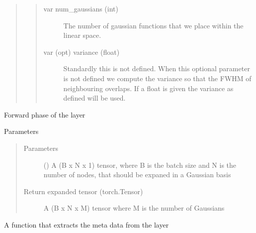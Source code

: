 \documentclass[letterpaper,10pt,english]{sphinxmanual}
\begin{document}
\begin{fulllineitems}
\begin{quote}
\begin{quote}
\begin{description}
\item[{var num\_gaussians (int)}] \leavevmode
The number of gaussian functions that we place within the linear space.

\item[{var (opt) variance (float)}] \leavevmode
Standardly this is not defined. When this optional parameter is not
defined we compute the variance so that the FWHM of neighbouring
overlaps. If a float is given the variance as defined will be used.

\end{description}\end{quote}
\end{quote}

\begin{fulllineitems}
\label{\detokenize{modules/gqcml.nn:gqcml.nn.layers.GaussianExpansion.forward}}
Forward phase of the layer

Parameters
\begin{quote}\begin{description}
\item[{Parameters}] \leavevmode
\sphinxstyleliteralstrong{\sphinxupquote{(}} () \textendash{} A (B x N x 1) tensor, where B is the batch size and N is the number of nodes,
that should be expaned in a Gaussian basis

\item[{Return expanded tensor (torch.Tensor)}] \leavevmode
A (B x N x M) tensor where M is the number of Gaussians

\end{description}\end{quote}

\end{fulllineitems}


\begin{fulllineitems}
\label{\detokenize{modules/gqcml.nn:gqcml.nn.layers.GaussianExpansion.meta}}
A function that extracts the meta data from the layer

\end{fulllineitems}


\end{fulllineitems}
\end{document}
